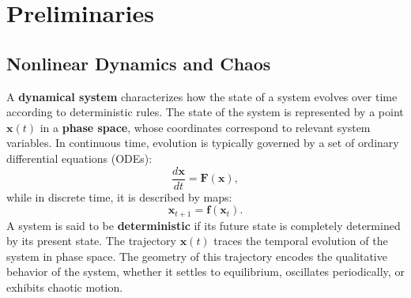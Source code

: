 \documentclass[a4paper,12pt]{article}
\begin{document}
\section{Preliminaries}
\label{sec:preliminaries}


\subsection{Nonlinear Dynamics and Chaos}
\label{subsec:nonlinear_dynamics}

A \textbf{dynamical system} characterizes how the state of a system evolves over time according to deterministic rules. The state of the system is represented by a point $\mathbf{x}(t)$ in a \textbf{phase space}, whose coordinates correspond to relevant system variables. In continuous time, evolution is typically governed by a set of ordinary differential equations (ODEs):
\begin{equation}
    \frac{d\mathbf{x}}{dt} = \mathbf{F}(\mathbf{x}),
\end{equation}
while in discrete time, it is described by maps:
\begin{equation}
    \mathbf{x}_{t+1} = \mathbf{f}(\mathbf{x}_t).
\end{equation}
A system is said to be \textbf{deterministic} if its future state is completely determined by its present state. The trajectory $\mathbf{x}(t)$ traces the temporal evolution of the system in phase space. The geometry of this trajectory encodes the qualitative behavior of the system, whether it settles to equilibrium, oscillates periodically, or exhibits chaotic motion. 

\end{document}
